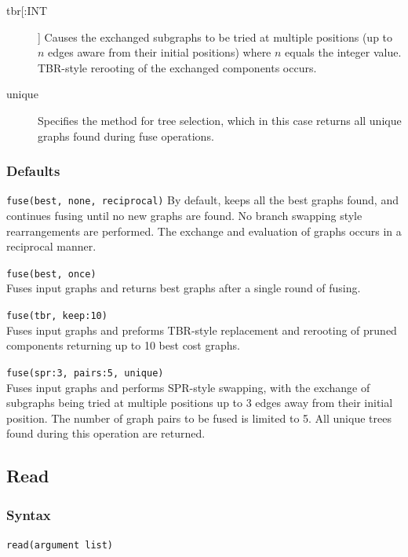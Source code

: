 \begin{description}
		\item [tbr[:INT]] Causes the exchanged subgraphs to be tried at multiple positions (up to 
		$n$ edges aware from their initial positions) where $n$ equals the integer value. TBR-style 
		rerooting of the exchanged components occurs.
		
		\item [unique] Specifies the method for tree selection, which in this case returns all unique 
		graphs found during fuse operations.	
	\end{description}	
	
	\subsubsection{Defaults}
		\texttt{fuse(best, none, reciprocal)} By default, \phyg keeps all the best graphs found, and 
		continues fusing until no new graphs are found. No branch swapping style rearrangements 
		are performed. The exchange and evaluation of graphs occurs in a reciprocal manner. 
			
	\begin{example}
		\item{\texttt{fuse(best, once)}\\Fuses input graphs and returns best graphs after a single round of 
		fusing.}
		
		\item{\texttt{fuse(tbr, keep:10)} \\Fuses input graphs and preforms TBR-style replacement and 
		rerooting of pruned components returning up to 10 best cost graphs.}
		
		\item{\texttt{fuse(spr:3, pairs:5, unique)} \\Fuses input graphs and performs SPR-style swapping, 
		with the exchange of subgraphs being tried at multiple positions up to 3 edges away from their 
		initial position. The number of graph pairs to be fused is limited to 5. All unique trees found
		during this operation are returned.}
	\end{example}

\subsection{Read}
\label{subsec:read}
	\subsubsection{Syntax}
		\texttt{read(argument list)}
			
